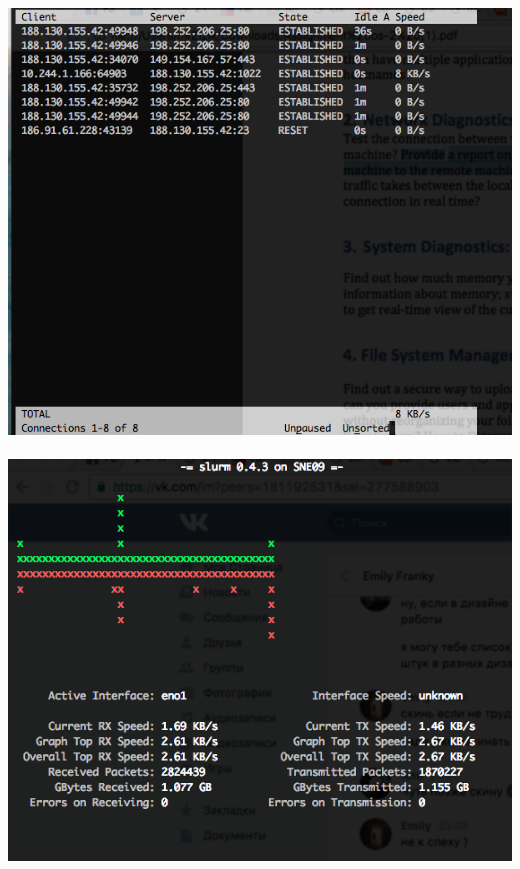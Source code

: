 \documentclass[10pt]{article}
\begin{document}
\includegraphics[width=\textwidth]{tcptrack} \\ \\
\includegraphics[width=\textwidth]{slurm} 
\end{document}
